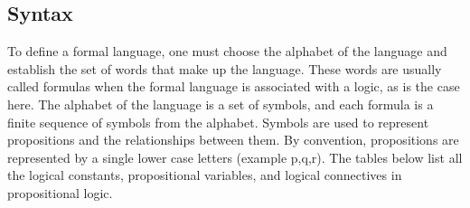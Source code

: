 \subsection{Syntax}
To define a formal language, one must choose the alphabet of the language and establish the set of words that make up the language. These words are usually called formulas when the formal language is associated with a logic, as is the case here. The alphabet of the language is a set of symbols, and each formula is a finite sequence of symbols from the alphabet.
Symbols are used to represent propositions and the relationships between them. By convention, propositions are represented by a single lower case letters (example p,q,r). The tables below list all the logical constants, propositional variables, and logical connectives in propositional logic.  

\begin{table}[h!]
    \centering
    \caption{Logical Constants and Propositional Variables}
\end{table}

\begin{table}[h!]
    \centering
    \caption{Logical Connectives}
\end{table}

